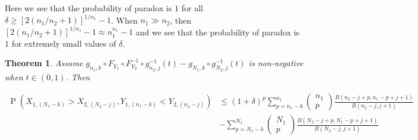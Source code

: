 \documentclass[12pt]{article}
\DeclareMathOperator*{\Prob}{P}
\newtheorem{theorem}{Theorem}[section]
\begin{document}
Here we see that the probability of paradox is $1$ for all $\delta \geq [2(n_1/n_2 + 1)]^{1/n_1} - 1$. When $n_1 \gg n_2$, then $[2(n_1/n_2 + 1)]^{1/n_1} - 1 \approx n_1^{n_1} - 1$ and we see that the probability of paradox is $1$ for extremely small values of $\delta$. 

\begin{theorem}
	Assume $g_{n_1, k} \circ F_{Y_1}\circ F_{Y_2}^{-1}\circ g_{n_2, j}^{-1}(t) - g_{N_1, k} \circ g_{N_2, j}^{-1}(t)$ is non-negative when $t \in (0,1)$. Then 
	
\begin{align*}
	\Prob\left(X_{1,(N_1 - k)} > X_{2,(N_2 - j)}, Y_{1,(n_1 - k)} < Y_{2,(n_2 - j)}\right) &\leq (1+\delta)^p\sum_{p=n_1-k}^{n_1}\left(\begin{array}{l}
n_1 \\
p
\end{array}\right)\frac{B(n_2-j+p, n_1-p+j+1)}{B(n_2-j, j+1)} \\
&- 
\sum_{p=N_1-k}^{N_1}\left(\begin{array}{l}
N_1 \\
p
\end{array}\right)\frac{B(N_2-j+p, N_1-p+j+1)}{B(N_2-j, j+1)}
\end{align*}

\end{theorem}
\end{document}
